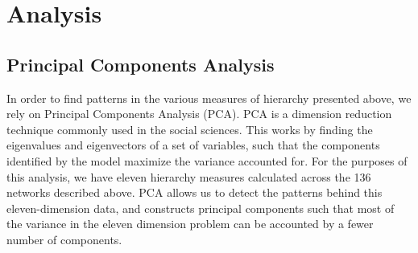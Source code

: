 \documentclass[3p,times]{elsarticle}
\begin{document}
%





\section{Analysis}
\label{sec:analysis}


\subsection{Principal Components Analysis}
In order to find patterns in the various measures of hierarchy presented above, we rely on Principal Components Analysis (PCA). PCA is a dimension reduction technique commonly used in the social sciences. This works by finding the eigenvalues and eigenvectors of a set of variables, such that the components identified by the model maximize the variance accounted for. For the purposes of this analysis, we have eleven hierarchy measures calculated across the 136 networks described above. PCA allows us to detect the patterns behind this eleven-dimension data, and constructs principal components such that most of the variance in the eleven dimension problem can be accounted by a fewer number of components.
\end{document}
